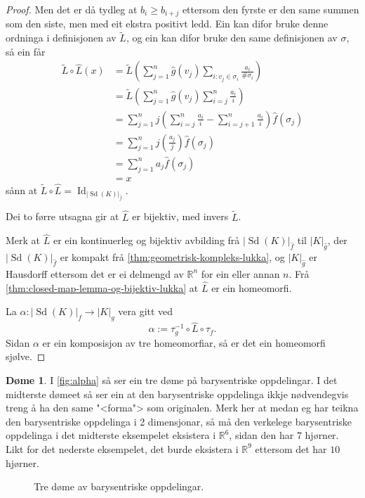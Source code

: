 \documentclass[a4paper, 12pt, norsk]{article}
\theoremstyle{plain}
\theoremstyle{definition}
\newtheorem{example}[theorem]{Døme}
\newcommand{\Rb}{\mathbb{R}}
\newcommand{\gr}[1]{ \lvert #1 \rvert } %
\newcommand{\tuple}[1]{ \left( #1 \right) } %
\DeclareMathOperator{\Sd}{Sd} %
\DeclareMathOperator{\Id}{Id} %
\begin{document}
\begin{proof}
	Men det er då tydleg at \( b_i \geq b_{i+j} \) ettersom den fyrste er den same summen som den siste, men med eit ekstra positivt ledd. Ein kan difor bruke denne ordninga i definisjonen av \( \tilde{L} \), og ein kan difor bruke den same definisjonen av \( \sigma \), så ein får
	\begin{align*}
		\tilde{L}\circ\hat{L}(x) &= \tilde{L}\tuple{\sum_{j=1}^n \hat{g}(v_j) \sum_{i:v_j\in\sigma_i}\frac{a_i}{\#\sigma_i}} \\
		&= \tilde{L}\tuple{\sum_{j=1}^n \hat{g}(v_j) \sum_{i=j}^n \frac{a_i}{i}} \\
		&= \sum_{j=1}^n j\tuple{\sum_{i=j}^n \frac{a_i}{i} - \sum_{i=j+1}^n \frac{a_i}{i}}\hat{f}(\sigma_j) \\
		&= \sum_{j=1}^n j\tuple{\frac{a_j}{j}}\hat{f}(\sigma_j) \\
		&= \sum_{j=1}^n a_j \hat{f}(\sigma_j) \\
		&= x
	\end{align*}
	sånn at \( \tilde{L}\circ\hat{L} = \Id_{\gr{\Sd(K)}_{\hat{f}}} \). 
	
	Dei to førre utsagna gir at \( \hat{L} \) er bijektiv, med invers \( \tilde{L} \).

	Merk at \( \hat{L} \) er ein kontinuerleg og bijektiv avbilding frå \( \gr{\Sd(K)}_{\hat{f}} \) til \( \gr{K}_{\hat{g}} \), der \( \gr{\Sd(K)}_{\hat{f}} \) er kompakt frå \autoref{thm:geometrisk-kompleks-lukka}, og  \( \gr{K}_{\hat{g}} \) er Hausdorff ettersom det er ei delmengd av \( \Rb^n \) for ein eller annan \( n \). Frå \autoref{thm:closed-map-lemma-og-bijektiv-lukka} at \( \hat{L} \) er ein homeomorfi.

	La \( \alpha: \gr{\Sd(K)}_f \to \gr{K}_g \) vera gitt ved
	\[
		\alpha := \tau_g^{-1} \circ \hat{L} \circ \tau_f.
	\]
	Sidan \( \alpha \) er ein komposisjon av tre homeomorfiar, så er det ein homeomorfi sjølve.
\end{proof}

\begin{example}
	I \autoref{fig:alpha} så ser ein tre døme på barysentriske oppdelingar. I det midterste dømeet så ser ein at den barysentriske oppdelinga ikkje nødvendegvis treng å ha den same "<forma"> som originalen. Merk her at medan eg har teikna den barysentriske oppdelinga i 2 dimensjonar, så må den verkelege barysentriske oppdelinga i det midterste eksempelet eksistera i \( \Rb^{6} \), sidan den har \( 7 \) hjørner. Likt for det nederste eksempelet, det burde eksistera i \( \Rb^9 \) ettersom det har \( 10 \) hjørner.
	\begin{figure}[htbp]
		\begin{center}
			
		\end{center}
		\caption{Tre døme av barysentriske oppdelingar.}
		\label{fig:alpha}
	\end{figure}
\end{example}
\end{document}
